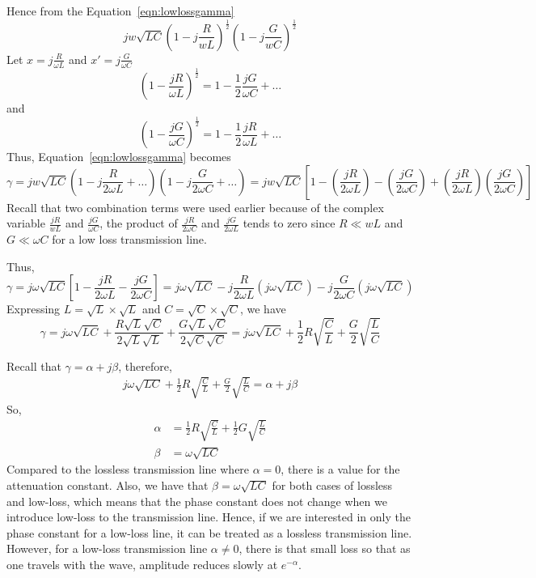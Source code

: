 Hence from the Equation~\eqref{eqn:lowlossgamma}
\[jw\sqrt{LC}\left(1 - j\frac{R}{wL}\right)^{\frac{1}{2}}\left(1 - j\frac{G}{wC}\right)^{\frac{1}{2}}\]
Let $x = j\frac{R}{\omega L}$ and $x' = j\frac{G}{\omega C}$
\begin{dmath*}
\left(1 - \frac{j R}{\omega L}\right)^{\frac{1}{2}} = 1 - \frac{1}{2}\frac{j G}{\omega C} + \ldots
\end{dmath*}
and
\begin{dmath*}
\left(1 - \frac{jG}{\omega C}\right)^{\frac{1}{2}} = 1 - \frac{1}{2}\frac{j R}{\omega L} + \ldots 
\end{dmath*}
Thus, Equation~\eqref{eqn:lowlossgamma} becomes
\begin{dmath*}
\gamma = jw\sqrt{LC}\left(1 - j \frac{R}{2\omega L} + \ldots\right)\left(1 - j\frac{G}{2\omega C} + \ldots\right) = jw\sqrt{LC} \left[1- \left(\frac{j R}{2\omega L}\right) - \left(\frac{j G}{2\omega C}\right) + \left(\frac{j R}{2\omega L}\right)\left(\frac{j G}{2\omega C}\right)\right]
\end{dmath*}
Recall that two combination terms were used earlier because of the complex variable $\frac{jR}{wL}$ and $\frac{j G}{\omega C}$, the product of $\frac{j R}{2\omega C}$ and $\frac{j G}{2\omega L}$ tends to zero since $R \ll wL$ and $G \ll \omega C$ for a low loss transmission line.

Thus,
\begin{dmath}  
\gamma = j\omega\sqrt{LC} \left[1- \frac{j R}{2\omega L} - \frac{j G}{2\omega C}\right] = j\omega\sqrt{LC} - j\frac{R}{2\omega L}\left(j\omega\sqrt{LC}\right) - j\frac{G}{2\omega C}\left(j\omega\sqrt{LC}\right)
\end{dmath}
Expressing $L = \sqrt{L} \times \sqrt{L}$ and $C = \sqrt{C} \times \sqrt{C}$, we have
\begin{dmath*}
\gamma = j\omega\sqrt{LC} + \frac{R\sqrt{L}\sqrt{C}}{2\sqrt{L}\sqrt{L}} + \frac{G\sqrt{L}\sqrt{C}}{2\sqrt{C}\sqrt{C}}
= j\omega\sqrt{LC} + \frac{1}{2}R\sqrt{\frac{C}{L}} + \frac{G}{2}\sqrt{\frac{L}{C}} 
\end{dmath*}

Recall that $\gamma = \alpha + j\beta$, therefore,
\begin{align*}
j\omega\sqrt{LC} + \frac{1}{2}R\sqrt{\frac{C}{L}} + \frac{G}{2}\sqrt{\frac{L}{C}} = \alpha + j\beta
\end{align*}
So,
\begin{align}
\alpha &= \frac{1}{2}R\sqrt{\frac{C}{L}} + \frac{1}{2}G\sqrt{\frac{L}{C}}\label{eqn:lowlossalpha}\\
\beta &= \omega\sqrt{LC}
\end{align}
Compared to the lossless transmission line where $\alpha = 0$, there is a value for the attenuation constant. Also, we have that $\beta = \omega\sqrt{LC}$ for both cases of lossless and low-loss, which means that the phase constant does not change when we introduce low-loss to the transmission line. Hence, if we are interested in only the phase constant for a low-loss line, it can be treated as a lossless transmission line. However, for a low-loss transmission line $\alpha \neq 0$, there is that small loss so that as one travels with the wave, amplitude reduces slowly at $e^{-\alpha}$.

